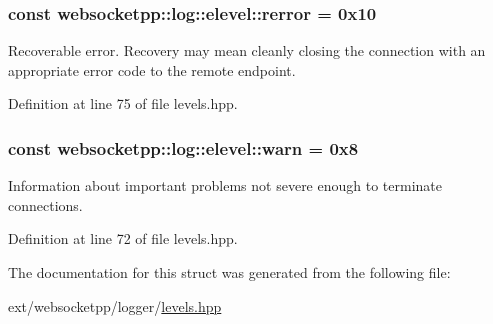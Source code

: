 \subsubsection[{rerror}]{ const websocketpp\+::log\+::elevel\+::rerror = 0x10\hspace{0.3cm}{\ttfamily [static]}}\label{structwebsocketpp_1_1log_1_1elevel_ae8a9a9f8b1fa45a731acd340e10aa342}
Recoverable error. Recovery may mean cleanly closing the connection with an appropriate error code to the remote endpoint. 

Definition at line 75 of file levels.\+hpp.

\hypertarget{structwebsocketpp_1_1log_1_1elevel_aef51fd791400121297f38f4381edaebe}{}
\subsubsection[{warn}]{ const websocketpp\+::log\+::elevel\+::warn = 0x8\hspace{0.3cm}{\ttfamily [static]}}\label{structwebsocketpp_1_1log_1_1elevel_aef51fd791400121297f38f4381edaebe}
Information about important problems not severe enough to terminate connections. 

Definition at line 72 of file levels.\+hpp.



The documentation for this struct was generated from the following file\+:\begin{DoxyCompactItemize}
\item 
ext/websocketpp/logger/\hyperlink{levels_8hpp}{levels.\+hpp}\end{DoxyCompactItemize}
